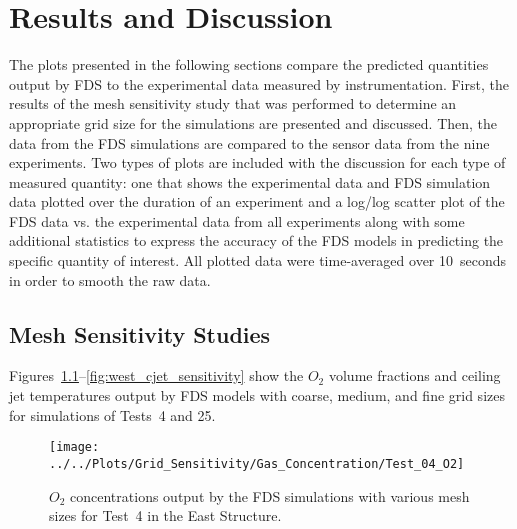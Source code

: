\renewcommand{\thechapter}{5}

\chapter{Results and Discussion}
\label{chap:results_disc}
The plots presented in the following sections compare the predicted quantities output by FDS to the experimental data measured by instrumentation. First, the results of the mesh sensitivity study that was performed to determine an appropriate grid size for the simulations are presented and discussed. Then, the data from the FDS simulations are compared to the sensor data from the nine experiments. Two types of plots are included with the discussion for each type of measured quantity: one that shows the experimental data and FDS simulation data plotted over the duration of an experiment and a log/log scatter plot of the FDS data vs. the experimental data from all experiments along with some additional statistics to express the accuracy of the FDS models in predicting the specific quantity of interest. All plotted data were time-averaged over 10~seconds in order to smooth the raw data.

\section{Mesh Sensitivity Studies}
\label{sec:mesh_studies}
Figures~\ref{fig:east_O2_sensitivity}--\ref{fig:west_cjet_sensitivity} show the $O_2$ volume fractions and ceiling jet temperatures output by FDS models with coarse, medium, and fine grid sizes for simulations of Tests~4 and 25.
\begin{figure}[!h]
	\centering
	\texttt{[image: ../../Plots/Grid\_Sensitivity/Gas\_Concentration/Test\_04\_O2]}
	\caption[$O_2$ concentrations for East Structure simulations of various mesh sizes.]{$O_2$ concentrations output by the FDS simulations with various mesh sizes for Test~4 in the East Structure.}
	\label{fig:east_O2_sensitivity}
\end{figure}

